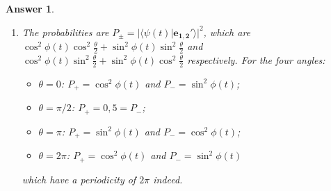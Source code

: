 \documentclass[a4paper]{article}
\newtheorem{ans}{Answer}[subsection]
\theoremstyle{new}
\begin{document}
\begin{ans}
\begin{enumerate}[label=(\roman*)]
$$\mathbf{e_1'}\cdot\mathbf{e_1'}=\mathbf{e_2'}\cdot\mathbf{e_2'}=\cos\frac{\theta}{2}\cos\frac{\theta}{2}-i i\sin\frac{\theta}{2}\sin\frac{\theta}{2}=1$$
For the four angles:
\begin{itemize}
    \item $\theta=0$: $\mathbf{e_1'}=(1,0)$ and $\mathbf{e_2'}=(0,1)$;
    \item $\theta=\pi/2$: $\mathbf{e_1'}=(1,i)/\sqrt{2}$ and $\mathbf{e_2'}=(i,1)/\sqrt{2}$;
    \item $\theta=\pi$: $\mathbf{e_1'}=(0,i)$ and $\mathbf{e_2'}=(i,0)$;
    \item $\theta=2\pi$: $\mathbf{e_1'}=(-1,0)$ and $\mathbf{e_2'}=(0,-1)$.
\end{itemize}
The eigenstates has $4\pi$ periodicity but the measurements (as we will see) ignore the global phase factors and will only have $2\pi$ periodicity.
\item The probabilities are $P_\pm=|\langle\psi(t)|\mathbf{e_{1,2}'}\rangle|^2$, which are $\cos^2\phi(t)\cos^2\frac{\theta}{2}+\sin^2\phi(t)\sin^2\frac{\theta}{2}$ and $\cos^2\phi(t)\sin^2\frac{\theta}{2}+\sin^2\phi(t)\cos^2\frac{\theta}{2}$ respectively. For the four angles:
\begin{itemize}
    \item $\theta=0$: $P_+=\cos^2\phi(t)$ and $P_-=\sin^2\phi(t)$;
    \item $\theta=\pi/2$: $P_+=0,5=P_-$;
    \item $\theta=\pi$: $P_+=\sin^2\phi(t)$ and $P_-=\cos^2\phi(t)$;
    \item $\theta=2\pi$: $P_+=\cos^2\phi(t)$ and $P_-=\sin^2\phi(t)$ 
\end{itemize}
which have a periodicity of $2\pi$ indeed.
\end{enumerate}
\end{ans}
\newpage
\end{document}
